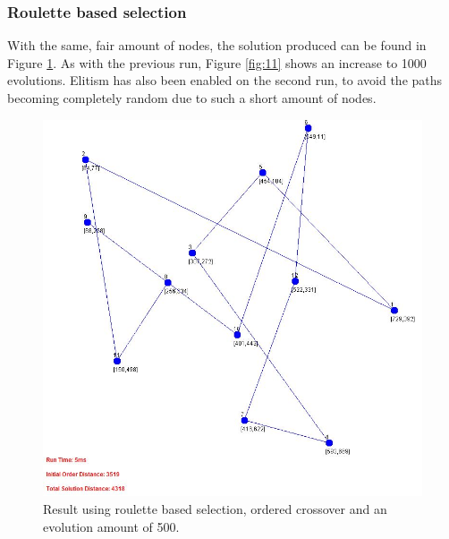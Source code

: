 \documentclass[article]{IEEEtran}
\begin{document}
\subsubsection{Roulette based selection}
With the same, fair amount of nodes, the solution produced can be found in Figure \ref{fig:10}. As with the previous run, Figure \ref{fig:11} shows an increase to 1000 evolutions. Elitism has also been enabled on the second run, to avoid the paths becoming completely random due to such a short amount of nodes.
\begin{figure}[H]
\centering
\includegraphics[width=.9\linewidth]{images/ordered_routlette_015_500_false}
\caption{Result using roulette based selection, ordered crossover and an evolution amount of 500.}
\label{fig:10}
\end{figure}
\end{document}
